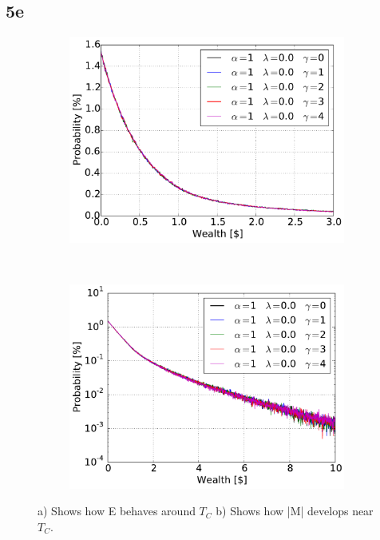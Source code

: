 \pagebreak
\subsection{5e}
\begin{figure}[H]
    \centering
    \begin{subfigure}{0.5\textwidth}
        \centering
        \includegraphics[width=\linewidth]{result/bilder/5e-1-00}
        \caption{}
    \end{subfigure}%
    ~ 
    \begin{subfigure}{0.5\textwidth}
        \centering
        \includegraphics[width=\linewidth]{result/bilder/5e-1-00-log}
        \caption{}
    \end{subfigure}
    \caption{a) Shows how E behaves around $T_C$ b) Shows how |M| develops near $T_C$.}
    \label{fig:5e-1-00}
\end{figure}



